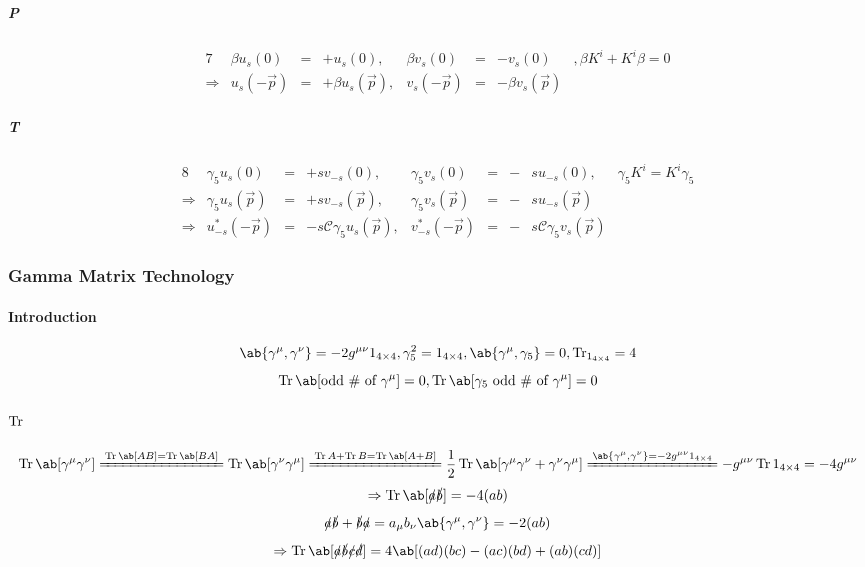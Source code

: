 \documentclass{article}
\newcommand{\calC}{\mathcal{C}}
\newcommand{\gammafive}{\gamma_5}
\newcommand{\gammamu}{\gamma^{\mu}}
\newcommand{\gammanu}{\gamma^{\nu}}
\newcommand{\gmunu}{g^{\mu\nu}}
\newcommand{\slasheda}{\slashed{a}}
\newcommand{\slashedb}{\slashed{b}}
\newcommand{\slashedc}{\slashed{c}}
\newcommand{\slashedd}{\slashed{d}}
\newcommand{\vecp}{\vec{p}}
\newcommand{\xleq}{\xlongequal}
\begin{document}
\subparagraph{P}

\begin{alignat*}{7}
                & \beta u_s(0) & = & + u_s(0),           & \beta v_s(0) & = & - v_s(0)           & , \beta K^i + K^i \beta = 0 \\
    \Rightarrow & u_s(- \vecp) & = & + \beta u_s(\vecp), & v_s(- \vecp) & = & - \beta v_s(\vecp) &
\end{alignat*}

\subparagraph{T}

\begin{alignat*}{8}
                & \gammafive u_s(0)     & = & + s v_{-s}(0),                   & \gammafive v_s(0)     & = & - & s u_{-s}(0),                  & \gammafive K^i = K^i \gammafive \\
    \Rightarrow & \gammafive u_s(\vecp) & = & + s v_{-s}(\vecp),               & \gammafive v_s(\vecp) & = & - & s u_{-s}(\vecp)               &                                 \\
    \Rightarrow & u^*_{-s}(- \vecp)     & = & - s \calC \gammafive u_s(\vecp), & v^*_{-s}(- \vecp)     & = & - & s \calC \gammafive v_s(\vecp) &
\end{alignat*}

\subsubsection{Gamma Matrix Technology}

\paragraph{Introduction}

\[ \ab\{\gammamu, \gammanu\} = - 2 \gmunu 1_{4\times 4}, \gammafive^2 = 1_{4\times 4}, \ab\{\gammamu, \gammafive\} = 0, \Tr_{1_{4\times 4}} = 4 \]
\[ \Tr\ab[\text{odd \# of } \gammamu] = 0, \Tr\ab[\gammafive \text{ odd \# of } \gammamu] = 0 \]

\paragraph{$\operatorname{Tr}$}

\[ \Tr\ab[\gammamu \gammanu] \xleq{\Tr\ab[AB] = \Tr\ab[BA]} \Tr\ab[\gammanu \gammamu] \xleq{\Tr A + \Tr B = \Tr \ab[A + B]} \frac{1}{2} \Tr\ab[\gammamu \gammanu + \gammanu \gammamu] \xleq{\ab\{\gammamu, \gammanu\} = - 2 \gmunu 1_{4\times 4}} - \gmunu \Tr 1_{4 \times 4} = - 4 \gmunu \]
\[ \Rightarrow \Tr\ab[\slasheda \slashedb] = - 4 (a b) \]
\[ \slasheda \slashedb + \slashedb \slasheda = a_{\mu} b_{\nu} \ab\{\gamma^{\mu}, \gamma^{\nu}\} = - 2 (a b) \]
\[ \Rightarrow \Tr\ab[\slasheda \slashedb \slashedc \slashedd] = 4 \ab[(ad) (bc) - (ac) (bd) + (ab) (cd)] \]
\end{document}

